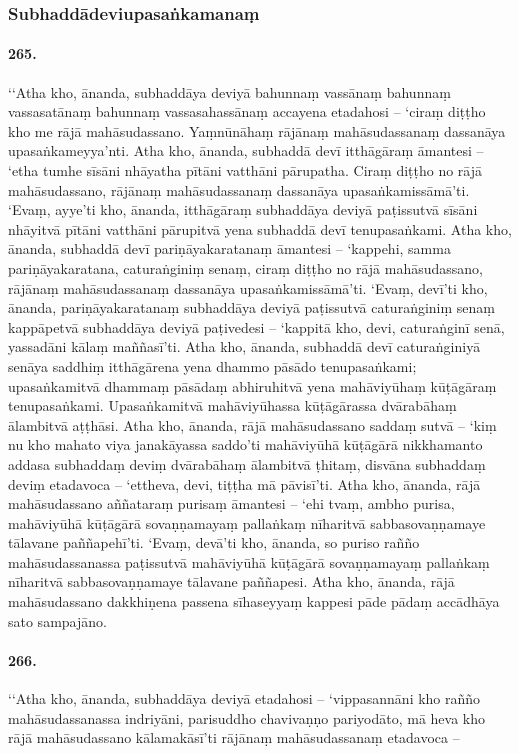 \subsubsection{Subhaddādeviupasaṅkamanaṃ}

\paragraph{265.} ‘‘Atha kho, ānanda, subhaddāya deviyā bahunnaṃ vassānaṃ bahunnaṃ vassasatānaṃ bahunnaṃ vassasahassānaṃ accayena etadahosi – ‘ciraṃ diṭṭho kho me rājā mahāsudassano. Yaṃnūnāhaṃ rājānaṃ mahāsudassanaṃ dassanāya upasaṅkameyya’nti. Atha kho, ānanda, subhaddā devī itthāgāraṃ āmantesi – ‘etha tumhe sīsāni nhāyatha pītāni vatthāni pārupatha. Ciraṃ diṭṭho no rājā mahāsudassano, rājānaṃ mahāsudassanaṃ dassanāya upasaṅkamissāmā’ti. ‘Evaṃ, ayye’ti kho, ānanda, itthāgāraṃ subhaddāya deviyā paṭissutvā sīsāni nhāyitvā pītāni vatthāni pārupitvā yena subhaddā devī tenupasaṅkami. Atha kho, ānanda, subhaddā devī pariṇāyakaratanaṃ āmantesi – ‘kappehi, samma pariṇāyakaratana, caturaṅginiṃ senaṃ, ciraṃ diṭṭho no rājā mahāsudassano, rājānaṃ mahāsudassanaṃ dassanāya upasaṅkamissāmā’ti. ‘Evaṃ, devī’ti kho, ānanda, pariṇāyakaratanaṃ subhaddāya deviyā paṭissutvā caturaṅginiṃ senaṃ kappāpetvā subhaddāya deviyā paṭivedesi – ‘kappitā kho, devi, caturaṅginī senā, yassadāni kālaṃ maññasī’ti. Atha kho, ānanda, subhaddā devī caturaṅginiyā senāya saddhiṃ itthāgārena yena dhammo pāsādo tenupasaṅkami; upasaṅkamitvā dhammaṃ pāsādaṃ abhiruhitvā yena mahāviyūhaṃ kūṭāgāraṃ tenupasaṅkami. Upasaṅkamitvā mahāviyūhassa kūṭāgārassa dvārabāhaṃ ālambitvā aṭṭhāsi. Atha kho, ānanda, rājā mahāsudassano saddaṃ sutvā – ‘kiṃ nu kho mahato viya janakāyassa saddo’ti mahāviyūhā kūṭāgārā nikkhamanto addasa subhaddaṃ deviṃ dvārabāhaṃ ālambitvā ṭhitaṃ, disvāna subhaddaṃ deviṃ etadavoca – ‘ettheva, devi, tiṭṭha mā pāvisī’ti. Atha kho, ānanda, rājā mahāsudassano aññataraṃ purisaṃ āmantesi – ‘ehi tvaṃ, ambho purisa, mahāviyūhā kūṭāgārā sovaṇṇamayaṃ pallaṅkaṃ nīharitvā sabbasovaṇṇamaye tālavane paññapehī’ti. ‘Evaṃ, devā’ti kho, ānanda, so puriso rañño mahāsudassanassa paṭissutvā mahāviyūhā kūṭāgārā sovaṇṇamayaṃ pallaṅkaṃ nīharitvā sabbasovaṇṇamaye tālavane paññapesi. Atha kho, ānanda, rājā mahāsudassano dakkhiṇena passena sīhaseyyaṃ kappesi pāde pādaṃ accādhāya sato sampajāno.

\paragraph{266.} ‘‘Atha kho, ānanda, subhaddāya deviyā etadahosi – ‘vippasannāni kho rañño mahāsudassanassa indriyāni, parisuddho chavivaṇṇo pariyodāto, mā heva kho rājā mahāsudassano kālamakāsī’ti rājānaṃ mahāsudassanaṃ etadavoca –

